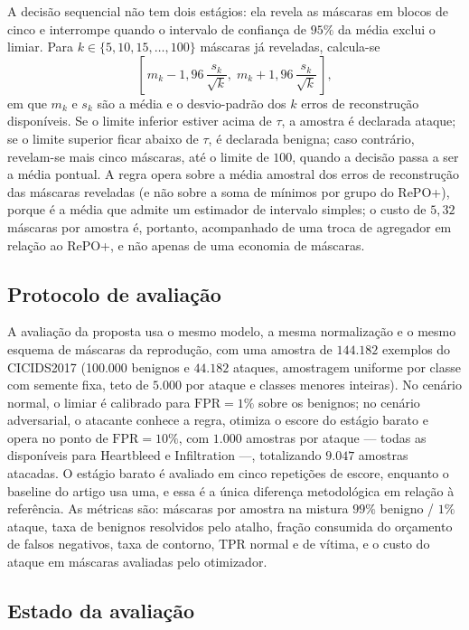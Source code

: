 \documentclass[conference]{IEEEtran}
\begin{document}
A decisão sequencial não tem dois estágios: ela revela as máscaras em blocos de cinco e interrompe quando o intervalo de confiança de $95\%$ da média exclui o limiar.
Para $k \in \{5, 10, 15, \dots, 100\}$ máscaras já reveladas, calcula-se
\begin{equation}
\left[\, m_k - 1{,}96\,\frac{s_k}{\sqrt{k}},\; m_k + 1{,}96\,\frac{s_k}{\sqrt{k}} \,\right],
\label{eq:ic_sequencial}
\end{equation}
em que $m_k$ e $s_k$ são a média e o desvio-padrão dos $k$ erros de reconstrução disponíveis.
Se o limite inferior estiver acima de $\tau$, a amostra é declarada ataque; se o limite superior ficar abaixo de $\tau$, é declarada benigna; caso contrário, revelam-se mais cinco máscaras, até o limite de $100$, quando a decisão passa a ser a média pontual.
A regra opera sobre a média amostral dos erros de reconstrução das máscaras reveladas (e não sobre a soma de mínimos por grupo do RePO+), porque é a média que admite um estimador de intervalo simples; o custo de $5{,}32$ máscaras por amostra é, portanto, acompanhado de uma troca de agregador em relação ao RePO+, e não apenas de uma economia de máscaras.

\subsection{Protocolo de avaliação}

A avaliação da proposta usa o mesmo modelo, a mesma normalização e o mesmo esquema de máscaras da reprodução, com uma amostra de $144.182$ exemplos do CICIDS2017 (100.000 benignos e $44.182$ ataques, amostragem uniforme por classe com semente fixa, teto de $5.000$ por ataque e classes menores inteiras).
No cenário normal, o limiar é calibrado para $\text{FPR} = 1\%$ sobre os benignos; no cenário adversarial, o atacante conhece a regra, otimiza o escore do estágio barato e opera no ponto de $\text{FPR} = 10\%$, com $1.000$ amostras por ataque — todas as disponíveis para Heartbleed e Infiltration —, totalizando $9.047$ amostras atacadas.
O estágio barato é avaliado em cinco repetições de escore, enquanto o baseline do artigo usa uma, e essa é a única diferença metodológica em relação à referência.
As métricas são: máscaras por amostra na mistura $99\%$ benigno / $1\%$ ataque, taxa de benignos resolvidos pelo atalho, fração consumida do orçamento de falsos negativos, taxa de contorno, TPR normal e de vítima, e o custo do ataque em máscaras avaliadas pelo otimizador.

\subsection{Estado da avaliação}
\end{document}
